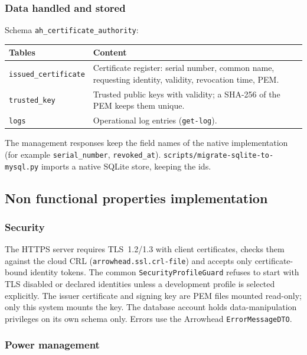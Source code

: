 \documentclass[a4paper]{arrowhead}
\begin{document}
\subsubsection{Data handled and stored}

Schema \texttt{ah\_\allowbreak{}certificate\_\allowbreak{}authority}:

\noindent\begin{longtable}{| p{6.4cm} | p{8.8cm} |} \hline
\rowcolor{gray!33} Tables & Content \\ \hline \endhead
\texttt{issued\_\allowbreak{}certificate} & Certificate register: serial number, common name, requesting identity, validity, revocation time, PEM. \\ \hline
\texttt{trusted\_\allowbreak{}key} & Trusted public keys with validity; a SHA-256 of the PEM keeps them unique. \\ \hline
\texttt{logs} & Operational log entries (\texttt{get-log}). \\ \hline
\end{longtable}

The management responses keep the field names of the native implementation (for example \texttt{serial\_number}, \texttt{revoked\_at}). \texttt{scripts/\allowbreak{}migrate-\allowbreak{}sqlite-\allowbreak{}to-\allowbreak{}mysql.py} imports a native SQLite store, keeping the ids.

\subsection{Non functional properties implementation}

\subsubsection{Security}

The HTTPS server requires TLS~1.2/1.3 with client certificates, checks them against the cloud CRL (\texttt{arrowhead.ssl.crl-file}) and accepts only certificate-bound identity tokens. The common \texttt{Security\allowbreak{}Profile\allowbreak{}Guard} refuses to start with TLS disabled or declared identities unless a development profile is selected explicitly. The issuer certificate and signing key are PEM files mounted read-only; only this system mounts the key. The database account holds data-manipulation privileges on its own schema only. Errors use the Arrowhead \texttt{ErrorMessageDTO}.

\subsubsection{Power management}
\end{document}
